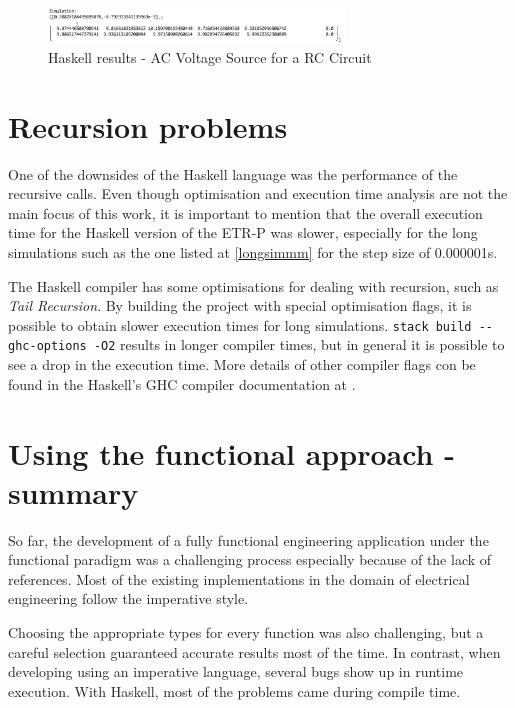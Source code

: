 \begin{figure}[H]
   \centering
   \includegraphics[width=0.7\textwidth]{img/capacitorcomparisonhaskell2.png}
   \caption{Haskell results - AC Voltage Source for a RC Circuit}
   \label{capacitorcomparisonhaskell2}
\end{figure}

\section{Recursion problems}

One of the downsides of the Haskell language was the performance of the recursive calls. Even though optimisation and execution time analysis are not the main focus of this work, it is important to mention that the overall execution time for the Haskell version of the ETR-P was slower, especially for the long simulations such as the one listed at \cref{longsimmm} for the step size of 0.000001s.


The Haskell compiler has some optimisations for dealing with recursion, such as \textit{Tail Recursion}. By building the project with special optimisation flags, it is possible to obtain slower execution times for long simulations. \lstinline!stack build --ghc-options -O2! results in longer compiler times, but in general it is possible to see a drop in the execution time. More details of other compiler flags con be found in the Haskell's GHC compiler documentation at \cite{ghc}.


\section{Using the functional approach - summary}

So far, the development of a fully functional engineering application under the functional paradigm was a challenging process especially because of the lack of references. Most of the existing implementations in the domain of electrical engineering follow the imperative style.

Choosing the appropriate types for every function was also challenging, but a careful selection guaranteed accurate results most of the time. In contrast, when developing using an imperative language, several bugs show up in runtime execution. With Haskell, most of the problems came during compile time.

